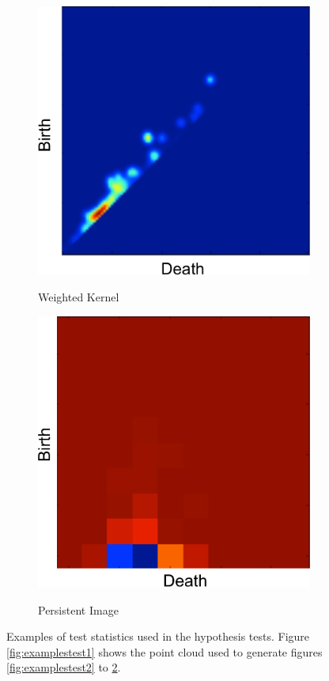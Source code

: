 \documentclass[12pt]{article}
\begin{document}
\begin{figure}[htbp]
\begin{subfigure}{.24\textwidth}
        \caption{Weighted Kernel}   \includegraphics[width=\linewidth]{test_pics_7.pdf}
    \label{fig:examplestest7}
  \end{subfigure}
    \begin{subfigure}{.24\textwidth}
    \centering
        \caption{Persistent Image}  \includegraphics[width=\linewidth]{test_pics_8.pdf}
    \label{fig:examplestest8}
  \end{subfigure}
   \caption{Examples of test statistics used in the hypothesis tests. Figure \ref{fig:examplestest1} shows the point cloud used to generate figures \ref{fig:examplestest2} to \ref{fig:examplestest8}.}
   \label{fig:examples}
\end{figure}
\end{document}
